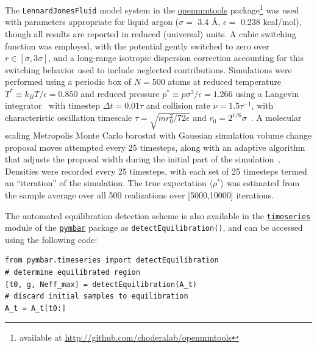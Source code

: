 \documentclass[aps,pre,twocolumn,nofootinbib,superscriptaddress,linenumbers,11point]{revtex4-1}
\newcommand{\expect}[1]{\langle #1 \rangle}                %
\begin{document}
The {\tt LennardJonesFluid} model system in the \href{http://github.com/choderalab/openmmtools}{openmmtools} package\footnote{available at \url{http://github.com/choderalab/openmmtools}} was used with parameters appropriate for liquid argon ($\sigma = $ 3.4 \AA, $\epsilon = $ 0.238 kcal/mol), though all results are reported in reduced (universal) units.
A cubic switching function was employed, with the potential gently switched to zero over $r \in [\sigma, 3 \sigma]$, and a long-range isotropic dispersion correction accounting for this switching behavior used to include neglected contributions.
Simulations were performed using a periodic box of $N = 500$ atoms at reduced temperature $T^* \equiv k_B T / \epsilon = 0.850$ and reduced pressure $p^* \equiv p \sigma^3 / \epsilon = 1.266$ using a Langevin integrator~\cite{sivak-chodera-crooks:jpcb:2014:vvvr} with timestep $\Delta t = 0.01 \tau$ and collision rate $\nu = 1.5 \tau^{-1}$, with characteristic oscillation timescale $\tau = \sqrt{m r_0^2 / 72 \epsilon}$ and $r_0 = 2^{1/6} \sigma$~\cite{liquid-argon-characteristic-timescale}.
A molecular scaling Metropolis Monte Carlo barostat with Gaussian simulation volume change proposal moves attempted every 25 timesteps, along with an adaptive algorithm that adjusts the proposal width during the initial part of the simulation~\cite{eastman:jctc:2012:openmm}.
Densities were recorded every 25 timesteps, with each set of 25 timesteps termed an ``iteration'' of the simulation.
The true expectation $\expect{ \rho^* }$ was estimated from the sample average over all 500 realizations over [5000,10000] iterations.

The automated equilibration detection scheme is also available in the \href{http://pymbar.readthedocs.org/en/latest/timeseries.html}{\tt timeseries} module of the \href{http://github.com/choderalab/pymbar}{\tt pymbar} package as {\tt detectEquilibration()}, and can be accessed using the following code:

\begin{verbatim}
from pymbar.timeseries import detectEquilibration
# determine equilibrated region
[t0, g, Neff_max] = detectEquilibration(A_t)
# discard initial samples to equilibration
A_t = A_t[t0:]
\end{verbatim}

\end{document}
